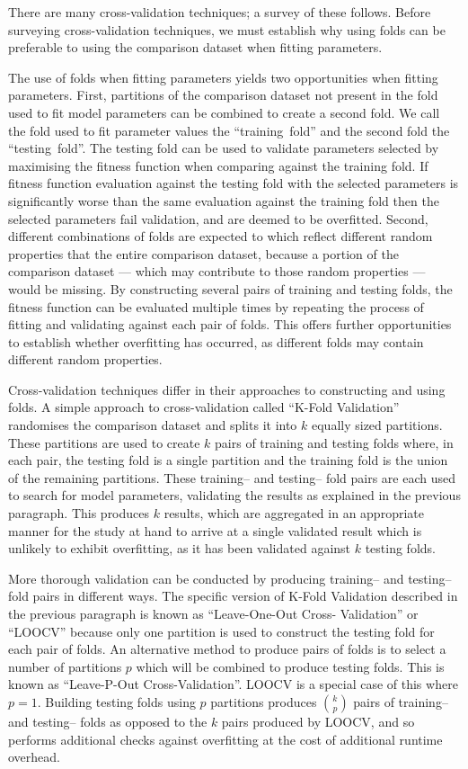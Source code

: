 There are many cross-validation techniques; a survey of these follows. Before
surveying cross-validation techniques, we must establish why using folds can be
preferable to using the comparison dataset when fitting parameters.

The use of folds when fitting parameters yields two opportunities when fitting
parameters.
First, partitions of the comparison dataset not present in the fold used to fit
model parameters can be combined to create a second fold. We call the fold used
to fit parameter values the ``training~fold'' and the second fold the
``testing~fold''. The testing fold can be used to validate parameters selected
by maximising the fitness function when comparing against the training fold. If
fitness function evaluation against the testing fold with the selected
parameters is significantly worse than the same evaluation against the training
fold then the selected parameters fail validation, and are deemed to be
overfitted.
Second, different combinations of folds are expected to which reflect different
random properties that the entire comparison dataset, because a portion of the
comparison dataset --- which may contribute to those random properties --- would
be missing. By constructing several pairs of training and testing folds, the
fitness function can be evaluated multiple times by repeating the process of
fitting and validating against each pair of folds. This offers further
opportunities to establish whether overfitting has occurred, as different folds
may contain different random properties.

Cross-validation techniques differ in their approaches to constructing and using
folds. A simple approach to cross-validation called ``K-Fold Validation''
randomises the comparison dataset and splits it into $k$ equally sized
partitions. These partitions are used to create $k$ pairs of training and
testing folds where, in each pair, the testing fold is a single partition and
the training fold is the union of the remaining partitions. These training-- and
testing-- fold pairs are each used to search for model parameters, validating
the results as explained in the previous paragraph. This produces $k$ results,
which are aggregated in an appropriate manner for the study at hand to arrive at
a single validated result which is unlikely to exhibit overfitting, as it has
been validated against $k$ testing folds.

More thorough validation can be conducted by producing training-- and testing--
fold pairs in different ways. The specific version of K-Fold Validation
described in the previous paragraph is known as ``Leave-One-Out Cross-
Validation'' or ``LOOCV'' because only one partition is used to construct the
testing fold for each pair of folds. An alternative method to produce pairs of
folds is to select a number of partitions $p$ which will be combined to produce
testing folds. This is known as ``Leave-P-Out Cross-Validation''. LOOCV is a
special case of this where $p=1$. Building testing folds using $p$ partitions
produces $\binom{k}{p}$ pairs of training-- and testing-- folds as opposed to
the $k$ pairs produced by LOOCV, and so performs additional checks against
overfitting at the cost of additional runtime overhead.

